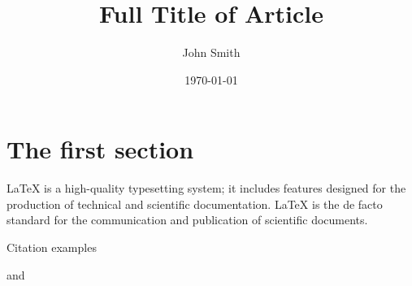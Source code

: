 \documentclass{article}
\title{Full Title of Article}
\author{John Smith}
\date{\today}
\begin{document}
\maketitle


\section{The first section}\label{my label}
LaTeX is a high-quality typesetting system; it includes features designed for the production of technical and scientific documentation. LaTeX is the de facto standard for the communication and publication of scientific documents.

Citation examples \cite{Tadmor2012,Shen1994,CaiFuLiuWang2022}

\cite{Adams2003,Tadmor2012} and \cite{Shen1994}


\printbibliography%
\end{document}
